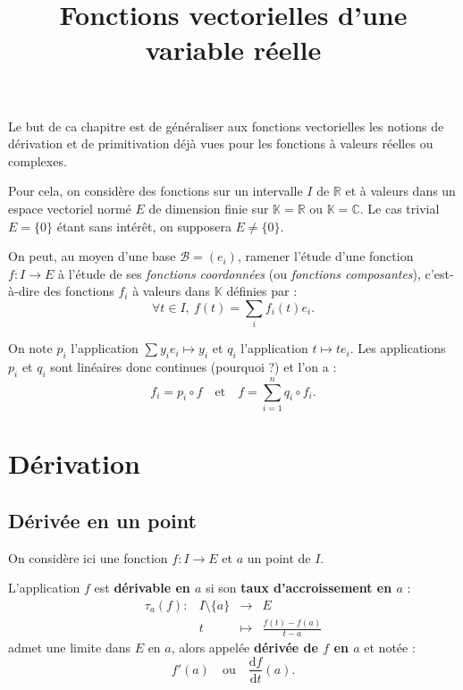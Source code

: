 \documentclass[french]{article}
\title{Fonctions vectorielles d'une variable réelle}
\date{}
\newcommand{\R}{\mathbb{R}}
\newcommand{\C}{\mathbb{C}}
\newcommand{\K}{\mathbb{K}}
\renewcommand{\d}{\text{d}}
\theoremstyle{plain}
\theoremstyle{definition}
\theoremstyle{remark}
\begin{document}
\tableofcontents

\newpage
\maketitle

Le but de ca chapitre est de généraliser aux fonctions vectorielles les notions de dérivation et de primitivation déjà vues pour les fonctions à valeurs réelles ou complexes.

Pour cela, on considère des fonctions sur un intervalle $I$ de $\R$ et à valeurs dans un espace vectoriel normé $E$ de dimension finie sur $\K=\R$ ou $\K=\C$. Le cas trivial $E=\{0\}$ étant sans intérêt, on supposera $E\ne\{0\}$.

On peut, au moyen d'une base $\mathcal{B}=(e_i)$, ramener l'étude d'une fonction $f:I\to E$ à l'étude de ses \textit{fonctions coordonnées} (ou \textit{fonctions composantes}), c'est-à-dire des fonctions $f_i$ à valeurs dans $\K$ définies par :
$$\forall t\in I,\ f(t)=\sum_{i}f_i(t)e_i.$$

On note $p_i$ l'application $\displaystyle\sum y_ie_i\mapsto y_i$ et $q_i$ l'application $t\mapsto te_i$. Les applications $p_i$ et $q_i$ sont linéaires donc continues (pourquoi ?) et l'on a :
$$f_i=p_i\circ f\quad\text{et}\quad f=\sum_{i=1}^{n}q_i\circ f_i.$$

\section{Dérivation}

\subsection{Dérivée en un point}

On considère ici une fonction $f:I\to E$ et $a$ un point de $I$.

\begin{dfn}
	L'application $f$ est \textbf{dérivable en $a$} si son \textbf{taux d'accroissement en $a$} :
	$$\begin{array}{lrcl}
		\tau_a(f):&I\setminus\{a\}&\longrightarrow&E\\
		&t&\longmapsto&\displaystyle\frac{f(t)-f(a)}{t-a}
	\end{array}$$
	admet une limite dans $E$ en $a$, alors appelée \textbf{dérivée de $f$ en $a$} et notée :
	$$f'(a)\quad\text{ou}\quad\frac{\d f}{\d t}(a).$$
\end{dfn}
\end{document}
